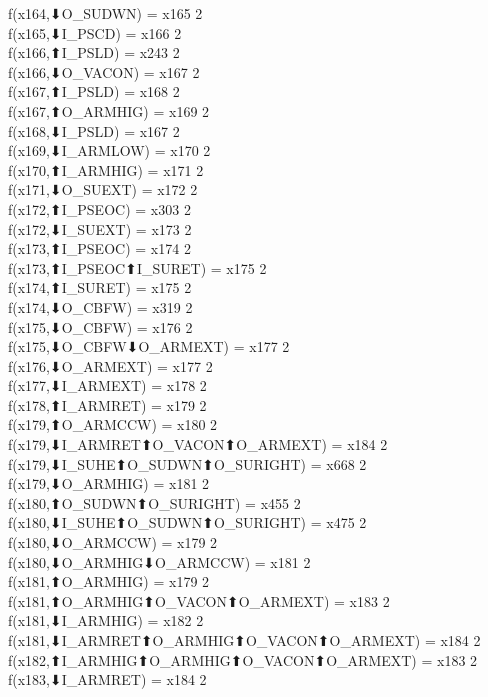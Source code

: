 f(x164,⬇O_SUDWN) = x165 {2} \\
f(x165,⬇I_PSCD) = x166 {2} \\
f(x166,⬆I_PSLD) = x243 {2} \\
f(x166,⬇O_VACON) = x167 {2} \\
f(x167,⬆I_PSLD) = x168 {2} \\
f(x167,⬆O_ARMHIG) = x169 {2} \\
f(x168,⬇I_PSLD) = x167 {2} \\
f(x169,⬇I_ARMLOW) = x170 {2} \\
f(x170,⬆I_ARMHIG) = x171 {2} \\
f(x171,⬇O_SUEXT) = x172 {2} \\
f(x172,⬆I_PSEOC) = x303 {2} \\
f(x172,⬇I_SUEXT) = x173 {2} \\
f(x173,⬆I_PSEOC) = x174 {2} \\
f(x173,⬆I_PSEOC⬆I_SURET) = x175 {2} \\
f(x174,⬆I_SURET) = x175 {2} \\
f(x174,⬇O_CBFW) = x319 {2} \\
f(x175,⬇O_CBFW) = x176 {2} \\
f(x175,⬇O_CBFW⬇O_ARMEXT) = x177 {2} \\
f(x176,⬇O_ARMEXT) = x177 {2} \\
f(x177,⬇I_ARMEXT) = x178 {2} \\
f(x178,⬆I_ARMRET) = x179 {2} \\
f(x179,⬆O_ARMCCW) = x180 {2} \\
f(x179,⬇I_ARMRET⬆O_VACON⬆O_ARMEXT) = x184 {2} \\
f(x179,⬇I_SUHE⬆O_SUDWN⬆O_SURIGHT) = x668 {2} \\
f(x179,⬇O_ARMHIG) = x181 {2} \\
f(x180,⬆O_SUDWN⬆O_SURIGHT) = x455 {2} \\
f(x180,⬇I_SUHE⬆O_SUDWN⬆O_SURIGHT) = x475 {2} \\
f(x180,⬇O_ARMCCW) = x179 {2} \\
f(x180,⬇O_ARMHIG⬇O_ARMCCW) = x181 {2} \\
f(x181,⬆O_ARMHIG) = x179 {2} \\
f(x181,⬆O_ARMHIG⬆O_VACON⬆O_ARMEXT) = x183 {2} \\
f(x181,⬇I_ARMHIG) = x182 {2} \\
f(x181,⬇I_ARMRET⬆O_ARMHIG⬆O_VACON⬆O_ARMEXT) = x184 {2} \\
f(x182,⬆I_ARMHIG⬆O_ARMHIG⬆O_VACON⬆O_ARMEXT) = x183 {2} \\
f(x183,⬇I_ARMRET) = x184 {2} \\
